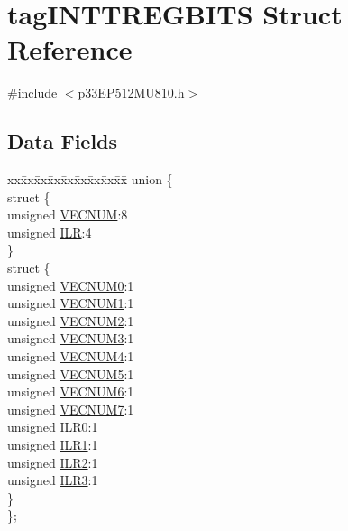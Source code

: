 \hypertarget{structtag_i_n_t_t_r_e_g_b_i_t_s}{}\section{tag\+I\+N\+T\+T\+R\+E\+G\+B\+I\+TS Struct Reference}
\label{structtag_i_n_t_t_r_e_g_b_i_t_s}


{\ttfamily \#include $<$p33\+E\+P512\+M\+U810.\+h$>$}

\subsection*{Data Fields}
\begin{DoxyCompactItemize}
\item 
\begin{tabbing}
xx\=xx\=xx\=xx\=xx\=xx\=xx\=xx\=xx\=\kill
union \{\\
\>struct \{\\
\>\>unsigned \hyperlink{structtag_i_n_t_t_r_e_g_b_i_t_s_a9278052ce5f21c7d30f9618676e63307}{VECNUM}:8\\
\>\>unsigned \hyperlink{structtag_i_n_t_t_r_e_g_b_i_t_s_acedce2a2404b45b026dc721fd0bd4f18}{ILR}:4\\
\>\} \\
\>struct \{\\
\>\>unsigned \hyperlink{structtag_i_n_t_t_r_e_g_b_i_t_s_aef0375076df2210e65e4c5976e8d9efb}{VECNUM0}:1\\
\>\>unsigned \hyperlink{structtag_i_n_t_t_r_e_g_b_i_t_s_acb8e8d4a18f726496f49ada6b955aa0a}{VECNUM1}:1\\
\>\>unsigned \hyperlink{structtag_i_n_t_t_r_e_g_b_i_t_s_a2ef17afc7e4d77a26f92027db1c7682d}{VECNUM2}:1\\
\>\>unsigned \hyperlink{structtag_i_n_t_t_r_e_g_b_i_t_s_a5c40cb0480d56e25dc1989d270cc844b}{VECNUM3}:1\\
\>\>unsigned \hyperlink{structtag_i_n_t_t_r_e_g_b_i_t_s_a1f1996bd65652d3233522e343587ab77}{VECNUM4}:1\\
\>\>unsigned \hyperlink{structtag_i_n_t_t_r_e_g_b_i_t_s_a2726b1a7a8e7173efb1097eec768e7ca}{VECNUM5}:1\\
\>\>unsigned \hyperlink{structtag_i_n_t_t_r_e_g_b_i_t_s_aa954314cbf531bef941c8efa79b4e212}{VECNUM6}:1\\
\>\>unsigned \hyperlink{structtag_i_n_t_t_r_e_g_b_i_t_s_afe49bbae378e76499bd185dde4d61713}{VECNUM7}:1\\
\>\>unsigned \hyperlink{structtag_i_n_t_t_r_e_g_b_i_t_s_a5f16ea78b2bfb38b0d403a62d9aefa17}{ILR0}:1\\
\>\>unsigned \hyperlink{structtag_i_n_t_t_r_e_g_b_i_t_s_a64211577657203bbcb1d8238e9ed2f8f}{ILR1}:1\\
\>\>unsigned \hyperlink{structtag_i_n_t_t_r_e_g_b_i_t_s_aeff39eda7ceb48903100a17a6ec923dd}{ILR2}:1\\
\>\>unsigned \hyperlink{structtag_i_n_t_t_r_e_g_b_i_t_s_a41c91c1582475bb6904018ee2e8fe240}{ILR3}:1\\
\>\} \\
\}; \\


\end{tabbing}
\end{DoxyCompactItemize}
